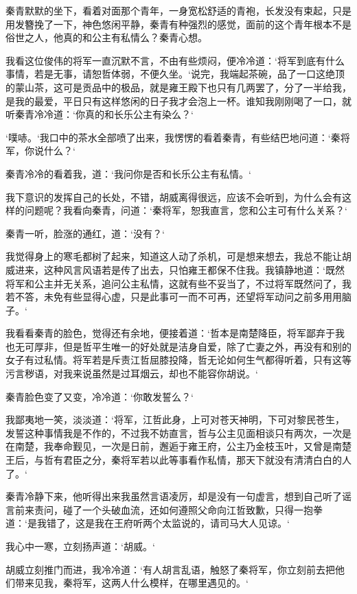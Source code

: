 秦青默默的坐下，看着对面那个青年，一身宽松舒适的青袍，长发没有束起，只是用发簪挽了一下，神色悠闲平静，秦青有种强烈的感觉，面前的这个青年根本不是俗世之人，他真的和公主有私情么？秦青心想。

我看这位俊伟的将军一直沉默不言，不由有些烦闷，便冷冷道：‘将军到底有什么事情，若是无事，请恕哲体弱，不便久坐。‘说完，我端起茶碗，品了一口这绝顶的蒙山茶，这可是贡品中的极品，就是雍王殿下也只有几两罢了，分了一半给我，是我的最爱，平日只有这样悠闲的日子我才会泡上一杯。谁知我刚刚喝了一口，就听秦青冷冷道：‘你真的和长乐公主有染么？‘

‘噗哧。‘我口中的茶水全部喷了出来，我愣愣的看着秦青，有些结巴地问道：‘秦将军，你说什么？‘

秦青冷冷的看着我，道：‘我问你是否和长乐公主有私情。‘

我下意识的发挥自己的长处，不错，胡威离得很远，应该不会听到，为什么会有这样的问题呢？我看向秦青，问道：‘秦将军，恕我直言，您和公主可有什么关系？‘

秦青一听，脸涨的通红，道：‘没有？‘

我觉得身上的寒毛都树了起来，知道这人动了杀机，可是想来想去，我总不能让胡威进来，这种风言风语若是传了出去，只怕雍王都保不住我。我镇静地道：‘既然将军和公主并无关系，追问公主私情，这就有些不妥当了，不过将军既然问了，我若不答，未免有些显得心虚，只是此事可一而不可再，还望将军动问之前多用用脑子。‘

我看看秦青的脸色，觉得还有余地，便接着道：‘哲本是南楚降臣，将军鄙弃于我也无可厚非，但是哲平生唯一的好处就是洁身自爱，除了亡妻之外，再没有和别的女子有过私情。将军若是斥责江哲屈膝投降，哲无论如何生气都得听着，只有这等污言秽语，对我来说虽然是过耳烟云，却也不能容你胡说。‘

秦青脸色变了又变，冷冷道：‘你敢发誓么？‘

我鄙夷地一笑，淡淡道：‘将军，江哲此身，上可对苍天神明，下可对黎民苍生，发誓这种事情我是不作的，不过我不妨直言，哲与公主见面相谈只有两次，一次是在南楚，我奉命觐见，一次是日前，邂逅于雍王府，公主乃金枝玉叶，又曾是南楚王后，与哲有君臣之分，秦将军若以此等事看作私情，那天下就没有清清白白的人了。‘

秦青冷静下来，他听得出来我虽然言语凌厉，却是没有一句虚言，想到自己听了谣言前来责问，碰了一个头破血流，还如何遵照父命向江哲致歉，只得一抱拳道：‘是我错了，这是我在王府听两个太监说的，请司马大人见谅。‘

我心中一寒，立刻扬声道：‘胡威。‘

胡威立刻推门而进，我冷冷道：‘有人胡言乱语，触怒了秦将军，你立刻前去把他们带来见我，秦将军，这两人什么模样，在哪里遇见的。‘

